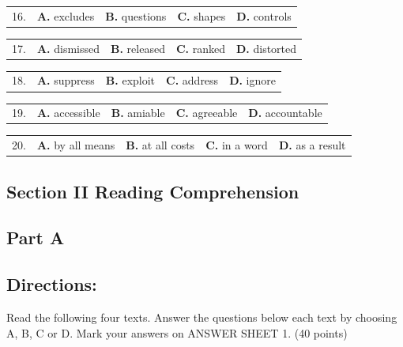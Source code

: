 \documentclass[UTF8,11pt]{ctexart}
\begin{document}
\noindent\begin{tabularx}{\linewidth}{@{}lXXXX@{}}16. & \textbf{A.} excludes & \textbf{B.} questions & \textbf{C.} shapes & \textbf{D.} controls\\\end{tabularx}\par

\noindent\begin{tabularx}{\linewidth}{@{}lXXXX@{}}17. & \textbf{A.} dismissed & \textbf{B.} released & \textbf{C.} ranked & \textbf{D.} distorted\\\end{tabularx}\par

\noindent\begin{tabularx}{\linewidth}{@{}lXXXX@{}}18. & \textbf{A.} suppress & \textbf{B.} exploit & \textbf{C.} address & \textbf{D.} ignore\\\end{tabularx}\par

\noindent\begin{tabularx}{\linewidth}{@{}lXXXX@{}}19. & \textbf{A.} accessible & \textbf{B.} amiable & \textbf{C.} agreeable & \textbf{D.} accountable\\\end{tabularx}\par

\noindent\begin{tabularx}{\linewidth}{@{}lXXXX@{}}20. & \textbf{A.} by all means & \textbf{B.} at all costs & \textbf{C.} in a word & \textbf{D.} as a result\\\end{tabularx}\par

\subsection*{\textbf{Section II Reading Comprehension}}


\subsection*{\textbf{Part A}}


\subsection*{\textbf{Directions:}}


Read the following four texts. Answer the questions below each text by choosing A, B, C or D. Mark your answers on ANSWER SHEET 1. (40 points)
\end{document}
